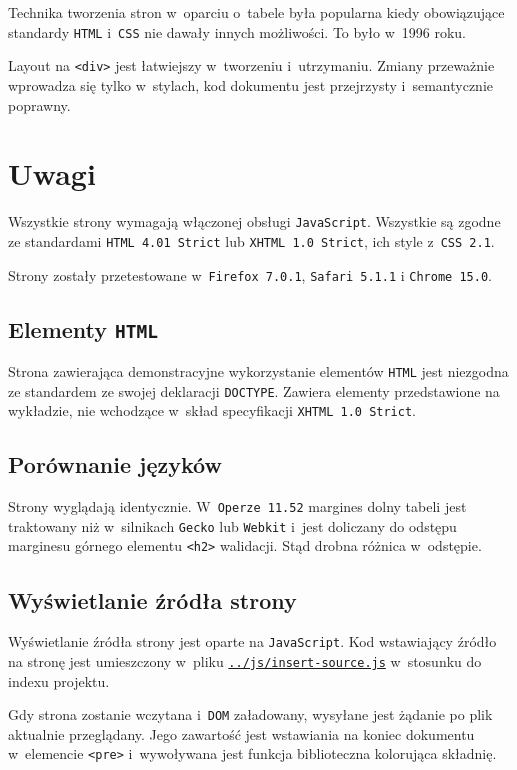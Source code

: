 \documentclass[10pt,a4paper]{article}
\newcommand{\f}[1]{\texttt{#1}}
\begin{document}
Technika tworzenia stron w~oparciu o~tabele była popularna kiedy obowiązujące
standardy \f{HTML} i~\f{CSS} nie dawały innych możliwości. To było w~1996 roku.

Layout na \f{<div>} jest łatwiejszy w~tworzeniu i~utrzymaniu. Zmiany przeważnie
wprowadza się tylko w~stylach, kod dokumentu jest przejrzysty i~semantycznie
poprawny.

\section{Uwagi}
Wszystkie strony wymagają włączonej obsługi \f{JavaScript}. Wszystkie są zgodne
ze standardami \f{HTML~4.01~Strict} lub \f{XHTML~1.0~Strict}, ich style
z~\f{CSS~2.1}.

Strony zostały przetestowane w~\f{Firefox 7.0.1}, \f{Safari 5.1.1} i \f{Chrome
15.0}.

\subsection{Elementy \f{HTML}}
Strona zawierająca demonstracyjne wykorzystanie elementów \f{HTML} jest
niezgodna ze standardem ze swojej deklaracji \f{DOCTYPE}. Zawiera elementy
przedstawione na wykładzie, nie wchodzące w~skład specyfikacji \f{XHTML 1.0
Strict}.

\subsection{Porównanie języków}
Strony wyglądają identycznie. W~\f{Operze 11.52} margines dolny tabeli jest
traktowany niż w~silnikach \f{Gecko} lub \f{Webkit} i~jest doliczany do odstępu
marginesu górnego elementu \f{<h2>} walidacji. Stąd drobna różnica w~odstępie.

\subsection{Wyświetlanie źródła strony}
Wyświetlanie źródła strony jest oparte na \f{JavaScript}. Kod wstawiający źródło
na stronę jest umieszczony w~pliku
\f{\href{https://github.com/student-tomasz/pi-laboratoria/blob/master/js/insert-source.js}{../js/insert-source.js}}
w~stosunku do indexu projektu.

Gdy strona zostanie wczytana i~\f{DOM} załadowany, wysyłane jest żądanie po plik
aktualnie przeglądany. Jego zawartość jest wstawiania na koniec dokumentu
w~elemencie \f{<pre>} i~wywoływana jest funkcja biblioteczna kolorująca
składnię.
\end{document}
